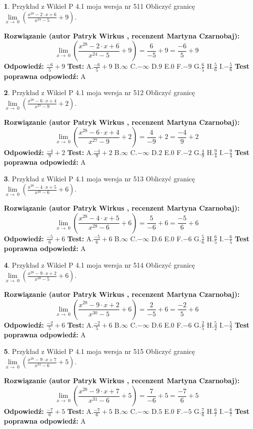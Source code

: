\documentclass[12pt, a4paper]{article}
\theoremstyle{definition} %
\newtheorem{zad}{}
\newcommand{\zadStart}[1]{\begin{zad}#1\newline}
\newcommand{\zadStop}{\end{zad}}
\newcommand{\rozwStart}[2]{\noindent \textbf{Rozwiązanie (autor #1 , recenzent #2): }\newline}
\newcommand{\rozwStop}{\newline}
\newcommand{\odpStart}{\noindent \textbf{Odpowiedź:}\newline}
\newcommand{\odpStop}{\newline}
\newcommand{\testStart}{\noindent \textbf{Test:}\newline}
\newcommand{\testStop}{\newline}
\newcommand{\kluczStart}{\noindent \textbf{Test poprawna odpowiedź:}\newline}
\newcommand{\kluczStop}{\newline}
\begin{document}
\zadStart{Przykład z Wikieł P 4.1 moja wersja nr 511}
Obliczyć granicę $\lim\limits_{x\to\ 0}(\frac{x^{28}-2 \cdot x +6}{x^{24}-5}+9)$.
\zadStop
\rozwStart{Patryk Wirkus}{Martyna Czarnobaj}
$$\lim\limits_{x\to\ 0}(\frac{x^{28}-2 \cdot x +6}{x^{24}-5}+9)=\frac{6}{-5}+9=\frac{-6}{5}+9$$
\rozwStop
\odpStart
$\frac{-6}{5}+9$
\odpStop
\testStart
A.$\frac{-6}{5}+9$
B.$\infty$
C.$-\infty$
D.$9$
E.$0$
F.$-9$
G.$\frac{6}{5}$
H.$\frac{5}{6}$
I.$-\frac{5}{6}$
\testStop
\kluczStart
A
\kluczStop



\zadStart{Przykład z Wikieł P 4.1 moja wersja nr 512}
Obliczyć granicę $\lim\limits_{x\to\ 0}(\frac{x^{28}-6 \cdot x +4}{x^{27}-9}+2)$.
\zadStop
\rozwStart{Patryk Wirkus}{Martyna Czarnobaj}
$$\lim\limits_{x\to\ 0}(\frac{x^{28}-6 \cdot x +4}{x^{27}-9}+2)=\frac{4}{-9}+2=\frac{-4}{9}+2$$
\rozwStop
\odpStart
$\frac{-4}{9}+2$
\odpStop
\testStart
A.$\frac{-4}{9}+2$
B.$\infty$
C.$-\infty$
D.$2$
E.$0$
F.$-2$
G.$\frac{4}{9}$
H.$\frac{9}{4}$
I.$-\frac{9}{4}$
\testStop
\kluczStart
A
\kluczStop



\zadStart{Przykład z Wikieł P 4.1 moja wersja nr 513}
Obliczyć granicę $\lim\limits_{x\to\ 0}(\frac{x^{28}-4 \cdot x +5}{x^{28}-6}+6)$.
\zadStop
\rozwStart{Patryk Wirkus}{Martyna Czarnobaj}
$$\lim\limits_{x\to\ 0}(\frac{x^{28}-4 \cdot x +5}{x^{28}-6}+6)=\frac{5}{-6}+6=\frac{-5}{6}+6$$
\rozwStop
\odpStart
$\frac{-5}{6}+6$
\odpStop
\testStart
A.$\frac{-5}{6}+6$
B.$\infty$
C.$-\infty$
D.$6$
E.$0$
F.$-6$
G.$\frac{5}{6}$
H.$\frac{6}{5}$
I.$-\frac{6}{5}$
\testStop
\kluczStart
A
\kluczStop



\zadStart{Przykład z Wikieł P 4.1 moja wersja nr 514}
Obliczyć granicę $\lim\limits_{x\to\ 0}(\frac{x^{28}-9 \cdot x +2}{x^{30}-5}+6)$.
\zadStop
\rozwStart{Patryk Wirkus}{Martyna Czarnobaj}
$$\lim\limits_{x\to\ 0}(\frac{x^{28}-9 \cdot x +2}{x^{30}-5}+6)=\frac{2}{-5}+6=\frac{-2}{5}+6$$
\rozwStop
\odpStart
$\frac{-2}{5}+6$
\odpStop
\testStart
A.$\frac{-2}{5}+6$
B.$\infty$
C.$-\infty$
D.$6$
E.$0$
F.$-6$
G.$\frac{2}{5}$
H.$\frac{5}{2}$
I.$-\frac{5}{2}$
\testStop
\kluczStart
A
\kluczStop



\zadStart{Przykład z Wikieł P 4.1 moja wersja nr 515}
Obliczyć granicę $\lim\limits_{x\to\ 0}(\frac{x^{28}-9 \cdot x +7}{x^{31}-6}+5)$.
\zadStop
\rozwStart{Patryk Wirkus}{Martyna Czarnobaj}
$$\lim\limits_{x\to\ 0}(\frac{x^{28}-9 \cdot x +7}{x^{31}-6}+5)=\frac{7}{-6}+5=\frac{-7}{6}+5$$
\rozwStop
\odpStart
$\frac{-7}{6}+5$
\odpStop
\testStart
A.$\frac{-7}{6}+5$
B.$\infty$
C.$-\infty$
D.$5$
E.$0$
F.$-5$
G.$\frac{7}{6}$
H.$\frac{6}{7}$
I.$-\frac{6}{7}$
\testStop
\kluczStart
A
\kluczStop
\end{document}
